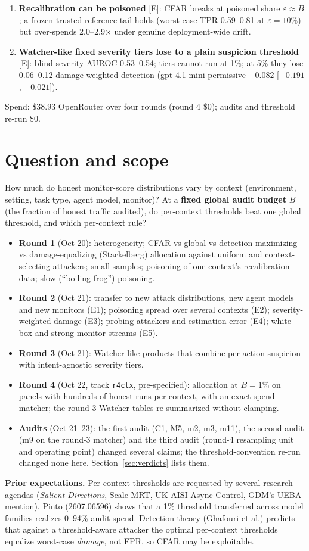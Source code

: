 \documentclass[11pt]{article}
\newcommand{\tE}{\textsf{\scriptsize\textcolor{ink2}{[E]}}\xspace}
\begin{document}
{\begin{enumerate}[leftmargin=1.2em]
\item \textbf{Recalibration can be poisoned} \tE: CFAR breaks at poisoned share $\varepsilon\approx B$; a frozen trusted-reference tail holds (worst-case TPR 0.59--0.81 at $\varepsilon=10\%$) but over-spends 2.0--2.9$\times$ under genuine deployment-wide drift.
\item \textbf{Watcher-like fixed severity tiers lose to a plain suspicion threshold} \tE: blind severity AUROC 0.53--0.54; tiers cannot run at 1\%; at 5\% they lose 0.06--0.12 damage-weighted detection (gpt-4.1-mini permissive $-0.082$ [$-0.191$, $-0.021$]).
\end{enumerate}
Spend: \$38.93 OpenRouter over four rounds (round 4 \$0); audits and threshold re-run \$0.}


\section{Question and scope}
How much do honest monitor-score distributions vary by context (environment, setting, task type, agent model, monitor)? At a \textbf{fixed global audit budget} $B$ (the fraction of honest traffic audited), do per-context thresholds beat one global threshold, and which per-context rule?
\begin{itemize}
\item \textbf{Round 1} (Oct 20): heterogeneity; CFAR vs global vs detection-maximizing vs damage-equalizing (Stackelberg) allocation against uniform and context-selecting attackers; small samples; poisoning of one context's recalibration data; slow (``boiling frog'') poisoning.
\item \textbf{Round 2} (Oct 21): transfer to new attack distributions, new agent models and new monitors (E1); poisoning spread over several contexts (E2); severity-weighted damage (E3); probing attackers and estimation error (E4); white-box and strong-monitor streams (E5).
\item \textbf{Round 3} (Oct 21): Watcher-like products that combine per-action suspicion with intent-agnostic severity tiers.
\item \textbf{Round 4} (Oct 22, track \texttt{r4ctx}, pre-specified): allocation at $B=1\%$ on panels with hundreds of honest runs per context, with an exact spend matcher; the round-3 Watcher tables re-summarized without clamping.
\item \textbf{Audits} (Oct 21--23): the first audit (C1, M5, m2, m3, m11), the second audit (m9 on the round-3 matcher) and the third audit (round-4 resampling unit and operating point) changed several claims; the threshold-convention re-run changed none here. Section~\ref{sec:verdicts} lists them.
\end{itemize}
\textbf{Prior expectations.} Per-context thresholds are requested by several research agendas (\emph{Salient Directions}, Scale MRT, UK AISI Async Control, GDM's UEBA mention). Pinto (2607.06596) shows that a 1\% threshold transferred across model families realizes 0--94\% audit spend. Detection theory (Ghafouri et al.) predicts that against a threshold-aware attacker the optimal per-context thresholds equalize worst-case \emph{damage}, not FPR, so CFAR may be exploitable.
\end{document}
